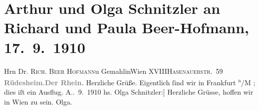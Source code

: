 

         
         \renewcommand{\erwaehntePersonen}{Personen: Richard Beer-Hofmann, Paula Beer-Hofmann}
         \renewcommand{\erwaehnteOrte}{Orte: Frankfurt am Main, Hasenauerstraße, Rhein, Rüdesheim, Wien, XVIII., Währing}
         \renewcommand{\erwaehnteWerke}{}
               \section[Arthur und Olga Schnitzler an Richard und Paula Beer-Hofmann, 17. 9. 1910]{ Arthur und Olga Schnitzler an Richard und Paula Beer-Hofmann,
               17. 9. 1910}\nopagebreak{}\rehead{ }\begin{ledgroupsized}[t]{13cm}\normalsize\beginnumbering \toendnotes[C]{\smallbreak\pagebreak[2]} 
\toendnotes[C]{\smallbreak}\pstart{}{\pb}Hrn Dr. \textsc{Rich. Beer
                     Hofmann}\pend{}\pstart{}u Gemahlin\pend{}\pstart{}Wien XVIII\pend{}\pstart{}\textsc{Hasenauerstr. 59}\pend{}{\bigskip}\pstart
           \noindent{}\centering{}{\pb}\textcolor{gray}{\textbf{Rüdesheim.\hspace*{1.5em}Der Rhein.}}\pend
           \pstart
           {\pb}Herzliche Grüße. Eigentlich ſind wir in Frankfurt \textsuperscript{a}/M ; dies
               iſt ein Ausflug.\pend
           \pstart \spacefill\mbox{A.}\pend{}. 9. 1910\pend
           \pstart
           \noindent{}{[}hs. Olga Schnitzler:{]} Herzliche Grüsse, \label{K_L01955-1v}\label{K_L01955-1h} hoffen wir in Wien zu sein.\pend
           \pstart \spacefill\mbox{Olga.}\pend{}
         
         \endnumbering{}\end{ledgroupsized}  \newcommand{\dateiname}{L01955}\newcommand{\titel}{Arthur und Olga Schnitzler an Richard und Paula Beer-Hofmann, 17. 9. 1910}\newcommand{\editorInnen}{Martin Anton Müller und Gerd-Hermann Susen}
      